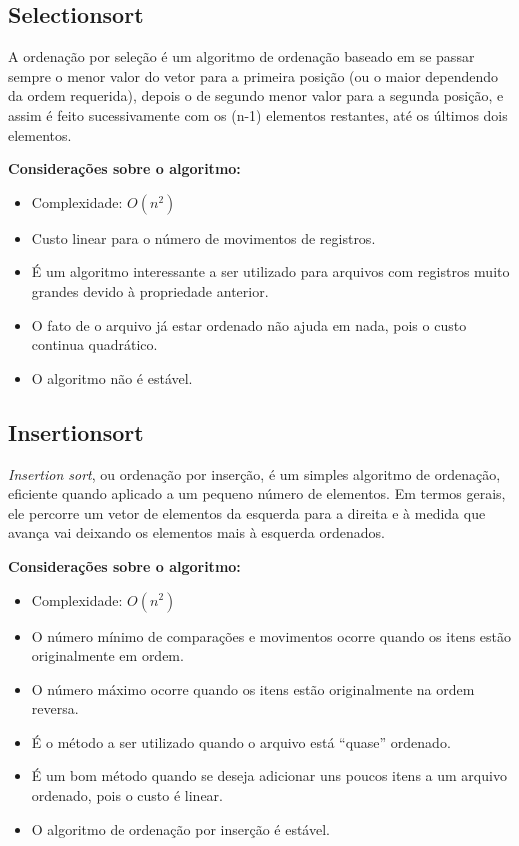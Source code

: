 \documentclass[
	11pt,
	oneside,
	a4paper,
	english,
	brazil,
	]{article}
\begin{document}
\subsection{Selectionsort}
A ordenação por seleção é um algoritmo de ordenação baseado em se passar
sempre o menor valor do vetor para a primeira posição (ou o maior
dependendo da ordem requerida), depois o de segundo menor valor para a 
segunda posição, e assim é feito sucessivamente com os (n-1) elementos 
restantes, até os últimos dois elementos. \cite{selection}

\noindent \textbf{Considerações sobre o algoritmo:}
\begin{itemize}
 \item Complexidade: $ O(n^2) $
 \item Custo linear para o número de movimentos de registros.
 \item É um algoritmo interessante a ser utilizado para arquivos com
registros muito grandes devido à propriedade anterior.
 \item O fato de o arquivo já estar ordenado não ajuda em nada, pois o 
custo continua quadrático.
 \item O algoritmo não é estável.
\end{itemize}

\subsection{Insertionsort}
\textit{Insertion sort}, ou ordenação por inserção, é um simples algoritmo
de ordenação, eficiente quando aplicado a um pequeno número de elementos. 
Em termos gerais, ele percorre um vetor de elementos da esquerda para 
a direita e à medida que avança vai deixando os elementos mais à esquerda
ordenados. \cite{insertion}

\noindent \textbf{Considerações sobre o algoritmo:}
\begin{itemize}
 \item Complexidade: $ O(n^2) $
 \item O número mínimo de comparações e movimentos ocorre quando os
itens estão originalmente em ordem.
 \item O número máximo ocorre quando os itens estão originalmente na
ordem reversa.
 \item É o método a ser utilizado quando o arquivo está ``quase'' ordenado.
 \item É um bom método quando se deseja adicionar uns poucos itens a um
arquivo ordenado, pois o custo é linear.
 \item O algoritmo de ordenação por inserção é estável.
\end{itemize}
\end{document}
